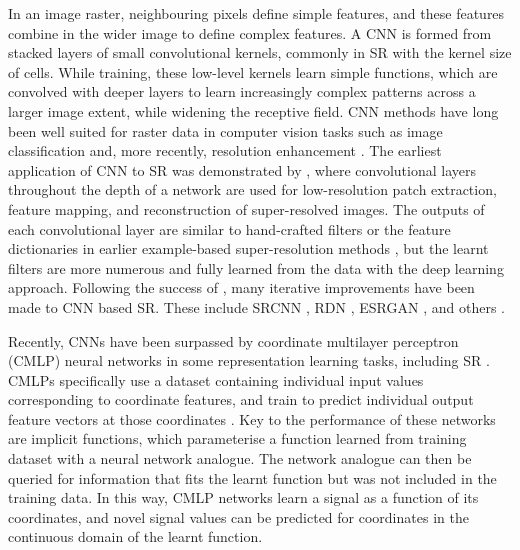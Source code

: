 In an image raster, neighbouring pixels define simple features, and these features combine in the wider image to define complex features.
A CNN is formed from stacked layers of small convolutional kernels, commonly in SR with the kernel size of  cells.
While training, these low-level kernels learn simple functions, which are convolved with deeper layers to learn increasingly complex patterns across a larger image extent, while widening the receptive field.
CNN methods have long been well suited for raster data in computer vision tasks such as image classification \parencite[e.g.][]{simonyanVeryDeepConvolutional2015} and, more recently, resolution enhancement \parencite[e.g.][]{zhangResidualDenseNetwork2018}.
The earliest application of CNN to SR was demonstrated by \textcite{dongLearningDeepConvolutional2014}, where convolutional layers throughout the depth of a network are used for low-resolution patch extraction, feature mapping, and reconstruction of super-resolved images.
The outputs of each convolutional layer are similar to hand-crafted filters or the feature dictionaries in earlier example-based super-resolution methods \parencite{freemanExamplebasedSuperresolution2002}, but the learnt filters are more numerous and fully learned from the data with the deep learning approach.
Following the success of \parencite{dongLearningDeepConvolutional2014}, many iterative improvements have been made to CNN based SR\@.
These include SRCNN \parencite{dongImageSuperresolutionUsing2016}, RDN \parencite{zhangResidualDenseNetwork2018}, ESRGAN \parencite{wangESRGANEnhancedSuperresolution2018}, and others \parencite{ledigPhotorealisticSingleImage2017,limEnhancedDeepResidual2017}.


Recently, CNNs have been surpassed by coordinate multilayer perceptron (CMLP) neural networks in some representation learning tasks, including SR \parencite{chenLearningContinuousImage2021}.
CMLPs specifically use a dataset containing individual input values corresponding to coordinate features, and train to predict individual output feature vectors at those coordinates \parencite[e.g.][]{mildenhallNeRFRepresentingScenes2020}.
Key to the performance of these networks are implicit functions, which parameterise a function learned from training dataset with a neural network analogue.
The network analogue can then be queried for information that fits the learnt function but was not included in the training data.
In this way, CMLP networks learn a signal as a function of its coordinates, and novel signal values can be predicted for coordinates in the continuous domain of the learnt function.

